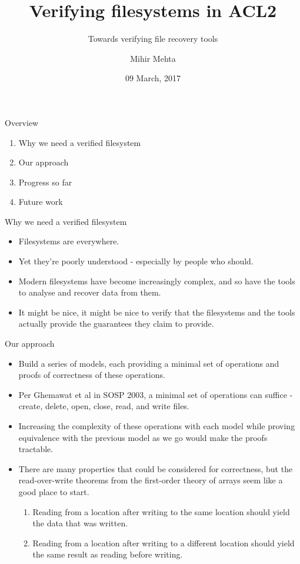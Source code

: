 \documentclass{beamer}
\title{Verifying filesystems in ACL2}
\subtitle{Towards verifying file recovery tools}
\author{Mihir Mehta}
\institute{
  Department of Computer Science\\
  University of Texas at Austin\\[1ex]
  \texttt{mihir@cs.utexas.edu}
}
\date{09 March, 2017}
\begin{document}
\begin{frame}[plain]
  \titlepage
\end{frame}

\begin{frame}{Overview}
  \begin{enumerate}
  \item Why we need a verified filesystem
  \item Our approach
  \item Progress so far
  \item Future work
  \end{enumerate}
\end{frame}

\begin{frame}{Why we need a verified filesystem}
  \begin{itemize}
  \item Filesystems are everywhere.
  \item Yet they're poorly understood - especially by people who
    should.
  \item Modern filesystems have become increasingly complex, and so
    have the tools to analyse and recover data from them.
  \item It might be nice, it might be nice to verify that the
    filesystems and the tools actually provide the guarantees they
    claim to provide.
  \end{itemize}
\end{frame}

\begin{frame}{Our approach}
  \begin{itemize}
  \item Build a series of models, each providing a minimal set of
    operations and proofs of correctness of these operations.
  \item Per Ghemawat et al in SOSP 2003, a minimal set of operations
    can suffice - create, delete, open, close, read, and write files.
  \item Increasing the complexity of these operations with each model
    while proving equivalence with the previous model as we go would
    make the proofs tractable.
  \item There are many properties that could be considered for
    correctness, but the read-over-write theorems from the first-order
    theory of arrays seem like a good place to start.
    \begin {enumerate}
    \item Reading from a location after writing to the same location
      should yield the data that was written.
    \item Reading from a location after writing to a different
      location should yield the same result as reading before writing.
    \end {enumerate}
  \end{itemize}
\end{frame}
\end{document}
